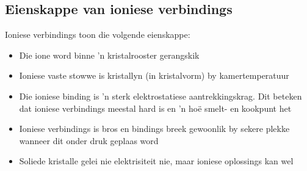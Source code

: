             \subsection*{Eienskappe van ioniese verbindings}
            \nopagebreak
Ioniese verbindings toon die volgende eienskappe:
        \label{m38684*id142815}\begin{itemize}[noitemsep]
            \label{m38684*uid72}\item Die ione word binne 'n kristalrooster gerangskik 
\label{m38684*uid73}\item Ioniese vaste stowwe is kristallyn (in kristalvorm) by kamertemperatuur
\label{m38684*uid74}\item Die ioniese binding is 'n sterk elektrostatiese aantrekkingskrag. Dit beteken dat ioniese verbindings meestal hard is en 'n ho\"{e} smelt- en kookpunt het
\label{m38684*uid75}\item Ioniese verbindings is bros en bindings breek gewoonlik by sekere plekke wanneer dit onder druk geplaas word
\label{m38684*uid76}\item Soliede kristalle gelei nie elektrisiteit nie, maar ioniese oplossings kan wel
\end{itemize}
\label{m38684*secfhsst!!!underscore!!!id522}
